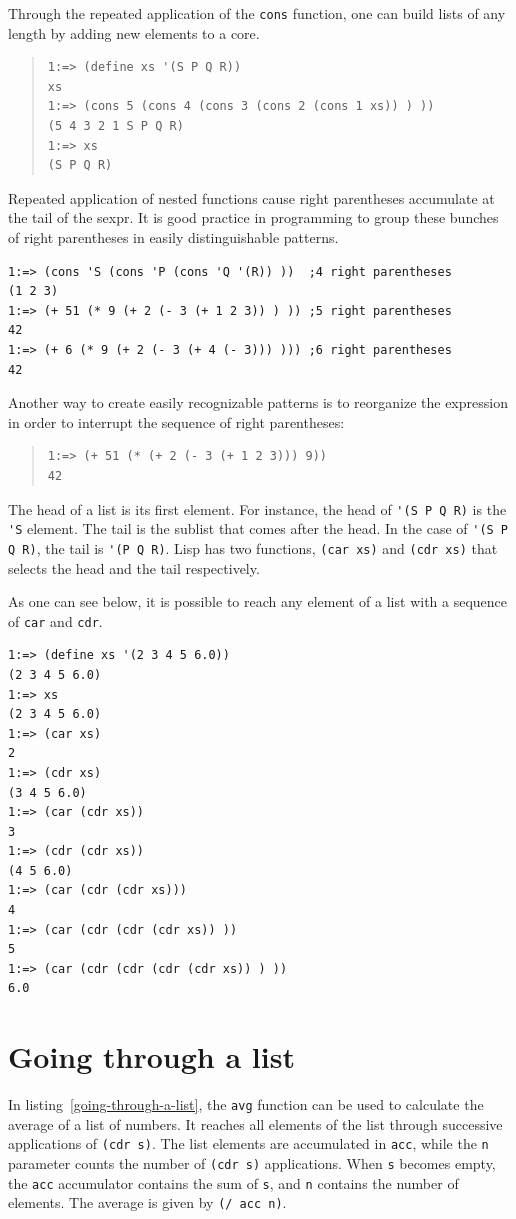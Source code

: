 \documentclass[a4paper,12pt]{book}
\begin{document}
Through the repeated application of the
\verb|cons| function, one can
build lists of any length
by adding new elements to
a core.
\begin{quote}
\begin{verbatim}
1:=> (define xs '(S P Q R))
xs
1:=> (cons 5 (cons 4 (cons 3 (cons 2 (cons 1 xs)) ) ))
(5 4 3 2 1 S P Q R)
1:=> xs
(S P Q R)
\end{verbatim}
\end{quote}
Repeated application of nested functions
cause right parentheses accumulate
at the tail of the sexpr.
It is good practice in programming
to group these bunches of right parentheses
in easily distinguishable patterns.
\begin{verbatim}
1:=> (cons 'S (cons 'P (cons 'Q '(R)) ))  ;4 right parentheses
(1 2 3)
1:=> (+ 51 (* 9 (+ 2 (- 3 (+ 1 2 3)) ) )) ;5 right parentheses
42 
1:=> (+ 6 (* 9 (+ 2 (- 3 (+ 4 (- 3))) ))) ;6 right parentheses
42
\end{verbatim}

Another way to create easily recognizable
patterns  is to
reorganize the expression in order
to interrupt the sequence
of right parentheses:
\begin{quote}
\begin{verbatim}
1:=> (+ 51 (* (+ 2 (- 3 (+ 1 2 3))) 9))
42
\end{verbatim}
\end{quote}

The head of a list is its first
element. For instance, the head
of \verb|'(S P Q R)| is the
\verb|'S| element. The tail
is the sublist that comes after
the head. In the case of
\verb|'(S P Q R)|, the tail
is \verb|'(P Q R)|. Lisp has
two functions, \verb|(car xs)|
and \verb|(cdr xs)| that
selects the head and the tail
respectively.


As one can see below,
it is possible to reach any
element of a list with
a sequence of \verb|car|
and \verb|cdr|.
\begin{verbatim}
1:=> (define xs '(2 3 4 5 6.0))
(2 3 4 5 6.0)
1:=> xs
(2 3 4 5 6.0)
1:=> (car xs)
2
1:=> (cdr xs)
(3 4 5 6.0)
1:=> (car (cdr xs))
3
1:=> (cdr (cdr xs))
(4 5 6.0)
1:=> (car (cdr (cdr xs)))
4
1:=> (car (cdr (cdr (cdr xs)) ))
5
1:=> (car (cdr (cdr (cdr (cdr xs)) ) ))
6.0
\end{verbatim}

\section{Going through a list}\label{sec:average}
In listing~\ref{going-through-a-list},
the \verb|avg| function can be used to
calculate the average of a list of numbers.
It reaches all elements of the list
through successive applications
of  \verb|(cdr s)|.
The list elements are accumulated in
\verb|acc|,
while the \verb|n| parameter counts
the number of \verb|(cdr s)| applications.
When  \verb|s| becomes empty, the \verb|acc|
accumulator contains the sum of \verb|s|, and \verb|n|
contains the number of elements. The average
is given by \verb|(/ acc n)|. 
\end{document}
